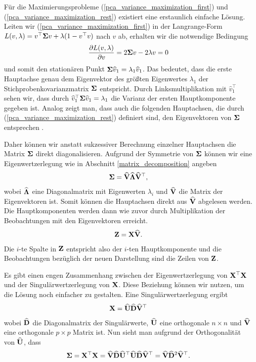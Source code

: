 Für die Maximierungsprobleme (\ref{pca_variance_maximization_first}) und (\ref{pca_variance_maximization_rest}) existiert eine erstaunlich einfache Lösung. Leiten wir (\ref{pca_variance_maximization_first}) in der Langrange-Form $L(v, \lambda) = v^{\top}\mathbf{\Sigma}v + \lambda (1-v^{\top}v)$ nach $v$ ab, erhalten wir die notwendige Bedingung 
$$\frac{\partial L(v,\lambda)}{\partial v} = 2\mathbf{\Sigma} v -2\lambda v=0$$
und somit den stationären Punkt $\mathbf{\Sigma}\widehat{v}_1 = \lambda_1 \widehat{v}_1$. Das bedeutet, dass die erste Hauptachse genau dem Eigenvektor des größten Eigenwertes $\lambda_1$ der Stichprobenkovarianzmatrix $\mathbf{\Sigma}$ entspricht. Durch Linksmultiplikation mit $\widehat{v}_1^{\top}$ sehen wir, dass durch 
$\widehat{v}_1^{\top}\mathbf{\Sigma}\widehat{v}_1 = \lambda_1$ die Varianz der ersten Hauptkomponente gegeben ist. Analog zeigt man, dass auch die folgenden Hauptachsen, die durch (\ref{pca_variance_maximization_rest}) definiert sind, den Eigenvektoren von $\mathbf{\Sigma}$ entsprechen \cite{bishop}.

Daher können wir anstatt sukzessiver Berechnung einzelner Hauptachsen die Matrix $\mathbf{\Sigma}$ direkt diagonalisieren. Aufgrund der Symmetrie von $\mathbf{\Sigma}$ können wir eine Eigenwertzerlegung wie in Abschnitt \ref{matrix_decomposition} angeben
$$\mathbf{\Sigma} = \widehat{\mathbf{V}} \widehat{\mathbf{\Lambda}} \widehat{\mathbf{V}}^{\top},$$
wobei $\widehat{\mathbf{\Lambda}}$ eine Diagonalmatrix mit Eigenwerten $\lambda_i$ und $\widehat{\mathbf{V}}$ die Matrix der Eigenvektoren ist. Somit können die Hauptachsen direkt aus $\widehat{\mathbf{V}}$ abgelesen werden. Die Hauptkomponenten werden dann wie zuvor durch Multiplikation der Beobachtungen mit den Eigenvektoren erreicht.
$$\mathbf{Z} = \mathbf{X} \widehat{\mathbf{V}}.$$
Die $i$-te Spalte in $\mathbf{Z}$ entspricht also der $i$-ten Hauptkomponente und die Beobachtungen bezüglich der neuen Darstellung sind die Zeilen von $\mathbf{Z}$.

Es gibt einen engen Zusammenhang zwischen der Eigenwertzerlegung von $\mathbf{X}^{\top} \mathbf{X}$ und der Singulärwertzerlegung von $\mathbf{X}$. Diese Beziehung können wir nutzen, um die Lösung noch einfacher zu gestalten. Eine Singulärwertzerlegung ergibt
$$\mathbf{X} = \widehat{\mathbf{U}}\widehat{\mathbf{D}}\widehat{\mathbf{V}}^{\top}$$
wobei $\widehat{\mathbf{D}}$ die Diagonalmatrix der Singulärwerte, $\widehat{\mathbf{U}}$ eine orthogonale $n \times n$ und $\widehat{\mathbf{V}}$ eine orthogonale $p \times p$ Matrix ist. Nun sieht man aufgrund der Orthogonalität von $\widehat{\mathbf{U}}$, dass
$$\mathbf{\Sigma} = \mathbf{X}^{\top} \mathbf{X} = \widehat{\mathbf{V}}\widehat{\mathbf{D}}\widehat{\mathbf{U}}^{\top} \widehat{\mathbf{U}}\widehat{\mathbf{D}}\widehat{\mathbf{V}}^{\top} = \widehat{\mathbf{V}} \widehat{\mathbf{D}}^2 \widehat{\mathbf{V}}^{\top}.$$

